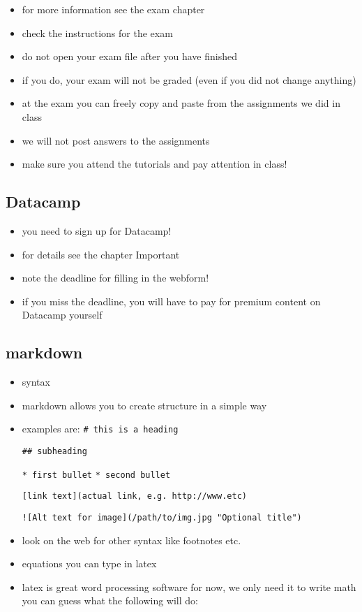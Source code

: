 \documentclass[]{book}
\providecommand{\tightlist}{%
  \setlength{\itemsep}{0pt}\setlength{\parskip}{0pt}}
\begin{document}
\begin{itemize}
\tightlist
\item
  for more information see the exam chapter
\item
  check the instructions for the exam
\item
  do not open your exam file after you have finished
\item
  if you do, your exam will not be graded (even if you did not change
  anything)
\item
  at the exam you can freely copy and paste from the assignments we did
  in class
\item
  we will not post answers to the assignments
\item
  make sure you attend the tutorials and pay attention in class!
\end{itemize}

\subsection{Datacamp}\label{datacamp-1}

\begin{itemize}
\tightlist
\item
  you need to sign up for Datacamp!
\item
  for details see the chapter Important
\item
  note the deadline for filling in the webform!
\item
  if you miss the deadline, you will have to pay for premium content on
  Datacamp yourself
\end{itemize}

\subsection{markdown}\label{markdown}

\begin{itemize}
\item
  syntax
\item
  markdown allows you to create structure in a simple way
\item
  examples are: \texttt{\#\ this\ is\ a\ heading}

  \texttt{\#\#\ subheading}

  \texttt{*\ first\ bullet} \texttt{*\ second\ bullet}

  \texttt{{[}link\ text{]}(actual\ link,\ e.g.\ http://www.etc)}

  \texttt{!{[}Alt\ text\ for\ image{]}(/path/to/img.jpg\ "Optional\ title")}
\item
  look on the web for other syntax like footnotes etc.
\item
  equations you can type in latex
\item
  latex is great word processing software for now, we only need it to
  write math you can guess what the following will do:
\end{itemize}
\end{document}
